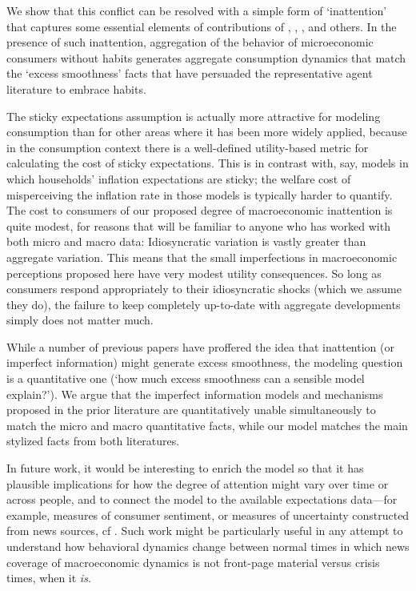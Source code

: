 \documentclass[titlepage]{\econtex}
\newcommand{\texname}{cAndCwithStickyE}
\begin{document}
We show that this conflict can be resolved with a simple form of `inattention' that captures some essential elements of contributions of \cite{simsInattention}, \cite{woodfordImperfect}, \cite{mrSlumps}, and others.  In the presence of such inattention, aggregation of the behavior of microeconomic consumers without habits generates aggregate consumption dynamics that match the `excess smoothness' facts that have persuaded the representative agent literature to embrace habits.

The sticky expectations assumption is actually more attractive for modeling consumption than for other areas where it has been more widely applied, because in the consumption context there is a well-defined utility-based metric for calculating the cost of sticky expectations.  This is in contrast with, say, models in which households' inflation expectations are sticky; the welfare cost of misperceiving the inflation rate in those models is typically harder to quantify.  The cost to consumers of our proposed degree of macroeconomic inattention is quite modest, for reasons that will be familiar to anyone who has worked with both micro and macro data: Idiosyncratic variation is vastly greater than aggregate variation.  This means that the small imperfections in macroeconomic perceptions proposed here have very modest utility consequences.  So long as consumers respond appropriately to their idiosyncratic shocks (which we assume they do), the failure to keep completely up-to-date with aggregate developments simply does not matter much.

While a number of previous papers have proffered the idea that inattention (or imperfect information) might generate excess smoothness, the modeling question is a quantitative one (`how much excess smoothness can a sensible model explain?').  We argue that the imperfect information models and mechanisms proposed in the prior literature are quantitatively unable simultaneously to match the micro and macro quantitative facts, while our model matches the main stylized facts from both literatures.

In future work, it would be interesting to enrich the model so that it has plausible implications for how the degree of attention might vary over time or across people, and to connect the model to the available expectations data---for example, measures of consumer sentiment, or measures of uncertainty constructed from news sources, cf \cite{bbdUncertainty}.  Such work might be particularly useful in any attempt to understand how behavioral dynamics change between normal times in which news coverage of macroeconomic dynamics is not front-page material versus crisis times, when it {\it is}.


\processdelayedfloats

\small

\normalsize


\end{document}
